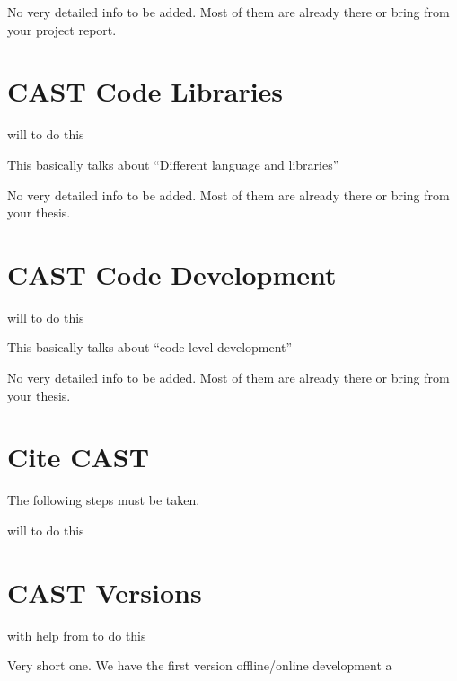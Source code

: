 \documentclass[letterpaper,10pt,english]{sphinxmanual}
\begin{document}
\sphinxAtStartPar
No very detailed info to be added.
Most of them are already there\sphinxhyphen{} or bring from your project report.


\chapter{CAST Code Libraries}
\label{\detokenize{contents/develop/code_libraries:cast-code-libraries}}\label{\detokenize{contents/develop/code_libraries::doc}}
\sphinxAtStartPar
{} will to do this

\sphinxAtStartPar
This basically talks about “Different language and libraries”

\sphinxAtStartPar
No very detailed info to be added.
Most of them are already there\sphinxhyphen{} or bring from your thesis.


\chapter{CAST Code Development}
\label{\detokenize{contents/develop/code_develop:cast-code-development}}\label{\detokenize{contents/develop/code_develop::doc}}
\sphinxAtStartPar
{} will to do this

\sphinxAtStartPar
This basically talks about “code level development”

\sphinxAtStartPar
No very detailed info to be added.
Most of them are already there\sphinxhyphen{} or bring from your thesis.


\chapter{Cite CAST}
\label{\detokenize{contents/ref/cite:cite-cast}}\label{\detokenize{contents/ref/cite::doc}}
\sphinxAtStartPar
The following steps must be taken.

\sphinxAtStartPar
{} will to do this


\chapter{CAST Versions}
\label{\detokenize{contents/ref/version:cast-versions}}\label{\detokenize{contents/ref/version::doc}}
\sphinxAtStartPar
{} with help from  to do this

\sphinxAtStartPar
Very short one.
We have the first version \sphinxhyphen{} offline/online development
a







\renewcommand{\indexname}{Index}
\printindex
\end{document}
